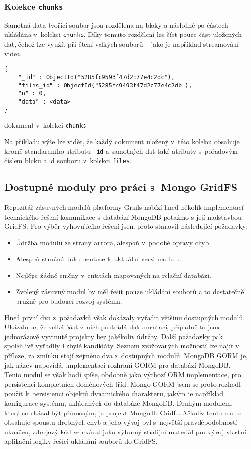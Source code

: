 \subsubsection{\textbf{Kolekce \texttt{chunks}}}
Samotná data tvořící soubor jsou rozdělena na bloky a následně po částech ukládána v~kolekci \texttt{chunks}. Díky tomuto rozdělení lze číst  pouze část uložených dat, čehož lze využít při čtení velkých souborů -- jako je například streamování videa.
\begin{example}
\centering
\begin{lstlisting}
{
    "_id" : ObjectId("5285fc9593f47d2c77e4c2dc"),
    "files_id" : ObjectId("5285fc9493f47d2c77e4c2db"),
    "n" : 0,
    "data" : <data>
}
\end{lstlisting}
\caption{dokument v~kolekci \texttt{chunks}}
\end{example}
Na příkladu výše lze vidět, že každý dokument uložený v~této kolekci obsahuje kromě standardního atributu \texttt{\_id} a samotných dat také atributy s~pořadovým číslem bloku a id  souboru v~kolekci \texttt{files}.

\subsection{Dostupné moduly pro práci s~Mongo GridFS}
Repozitář zásuvných modulů platformy Grails nabízí hned několik implementací technického řešení komunikace s~databází MongoDB potažmo s její nadstavbou GridFS. Pro výběr vyhovujícího řešení jsem proto stanovil následující požadavky:

\begin{itemize}
\item Údržba modulu ze strany autora, alespoň v~podobě opravy chyb.
\item Alespoň stručná dokumentace k~aktuální verzi modulu.
\item Nejlépe žádné změny v~entitách mapovaných na relační databázi.
\item Zvolený zásuvný modul by měl řešit pouze ukládání souborů a to dostatečně pružně pro budoucí rozvoj systému.
\end{itemize}

Hned první dva z~požadavků však dokázaly vyřadit většinu dostupných modulů. Ukázalo se, že velká část z~nich postrádá dokumentaci, případně to jsou jednorázově vyvinuté projekty bez jakékoliv údržby. Další požadavky pak spolehlivě vyřadily i zbylé kandidáty. Seznam zvažovaných možností lze najít v příloze, za zmínku stojí zejména dva z~dostupných modulů. MongoDB GORM je, jak název napovídá, implementací rozhraní GORM pro databází MongoDB. Tento modul se však hodí spíše, obdobně jako výchozí ORM implementace, pro persistenci kompletních doménových tříd. Mongo GORM jsem se proto rozhodl použít k~persistenci objektů dynamického charakteru, jakým je například konfigurace systému, ukládaných do databáze MongoDB. Druhým modulem, který se ukázal být přínosným, je projekt Mongodb Gridfs. Ačkoliv tento modul obsahuje spoustu drobných chyb a jeho vývoj byl s~největší pravděpodobností ukončen, zdrojový kód se ukázal jako výborný studijní materiál pro vývoj vlastní aplikační logiky řešící ukládání souborů do GridFS.
